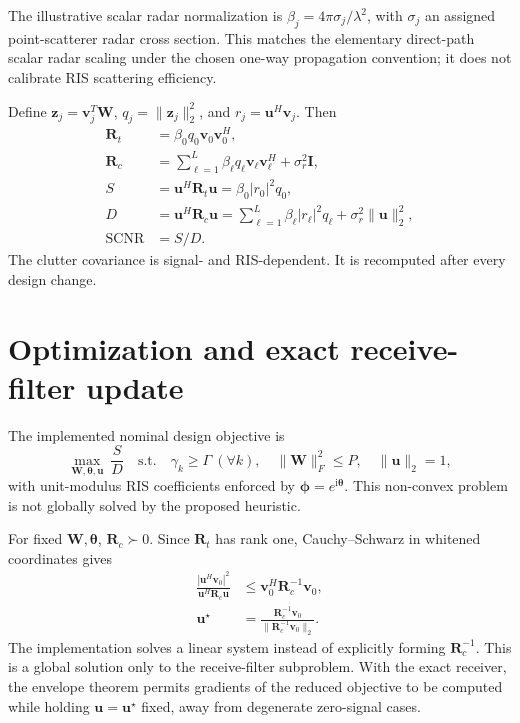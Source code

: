 \documentclass[11pt,a4paper]{article}
\newcommand{\SCNR}{\operatorname{SCNR}}\newcommand{\SINR}{\operatorname{SINR}}\newcommand{\Ree}{\operatorname{Re}}\newcommand{\diag}{\operatorname{diag}}
\begin{document}
The illustrative scalar radar normalization is $\beta_j=4\pi\sigma_j/\lambda^2$, with $\sigma_j$ an assigned point-scatterer radar cross section. This matches the elementary direct-path scalar radar scaling under the chosen one-way propagation convention; it does not calibrate RIS scattering efficiency.

Define $\mathbf z_j=\mathbf v_j^T\mathbf W$, $q_j=\|\mathbf z_j\|_2^2$, and $r_j=\mathbf u^H\mathbf v_j$. Then
\begin{subequations}\label{eq:cov}
\begin{align}
 \mathbf R_t&=\beta_0q_0\mathbf v_0\mathbf v_0^H,\\
 \mathbf R_c&=\sum_{\ell=1}^{L}\beta_\ell q_\ell\mathbf v_\ell\mathbf v_\ell^H+\sigma_r^2\mathbf I,\\
 S&=\mathbf u^H\mathbf R_t\mathbf u=\beta_0|r_0|^2q_0,\\
 D&=\mathbf u^H\mathbf R_c\mathbf u=\sum_{\ell=1}^{L}\beta_\ell|r_\ell|^2q_\ell+\sigma_r^2\|\mathbf u\|_2^2,\\
 \SCNR&=S/D.
\end{align}
\end{subequations}
The clutter covariance is signal- and RIS-dependent. It is recomputed after every design change.

\section{Optimization and exact receive-filter update}
The implemented nominal design objective is
\begin{equation}\label{eq:problem}
 \max_{\mathbf W,\boldsymbol\theta,\mathbf u}\ \frac{S}{D}
 \quad\text{s.t.}\quad
 \gamma_k\geq\Gamma\ (\forall k),\quad
 \|\mathbf W\|_F^2\leq P,\quad\|\mathbf u\|_2=1,
\end{equation}
with unit-modulus RIS coefficients enforced by $\boldsymbol\phi=e^{\mathrm i\boldsymbol\theta}$. This non-convex problem is not globally solved by the proposed heuristic.

For fixed $\mathbf W,\boldsymbol\theta$, $\mathbf R_c\succ0$. Since $\mathbf R_t$ has rank one, Cauchy--Schwarz in whitened coordinates gives
\begin{align}
 \frac{|\mathbf u^H\mathbf v_0|^2}{\mathbf u^H\mathbf R_c\mathbf u}
 &\leq\mathbf v_0^H\mathbf R_c^{-1}\mathbf v_0,\\
 \mathbf u^\star&=\frac{\mathbf R_c^{-1}\mathbf v_0}{\|\mathbf R_c^{-1}\mathbf v_0\|_2}.
\end{align}
The implementation solves a linear system instead of explicitly forming $\mathbf R_c^{-1}$. This is a global solution only to the receive-filter subproblem. With the exact receiver, the envelope theorem permits gradients of the reduced objective to be computed while holding $\mathbf u=\mathbf u^\star$ fixed, away from degenerate zero-signal cases.
\end{document}

